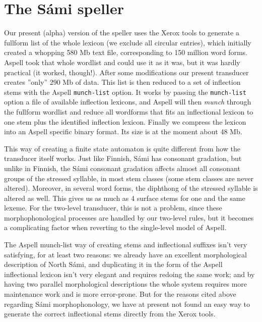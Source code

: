 \section{The S\'{a}mi speller}

Our present (alpha) version of the speller uses the Xerox tools to generate a fullform list of the whole lexicon (we exclude all circular entries), which initially created a whopping 580 Mb text file, corresponding to 150 million word forms. Aspell took that whole wordlist and could use it as it was, but it was hardly practical (it worked, though!). After some modifications our present transducer creates ''only'' 290 Mb of data. This list is then reduced to a set of inflection stems with the Aspell \texttt{munch-list} option. It works by passing the \texttt{munch-list} option a file of available inflection lexicons, and Aspell will then \textit{munch} through the fullform wordlist and reduce all wordforms that fits an inflectional lexicon to one stem plus the identified inflection lexicon. Finally we compress the lexicon into an Aspell specific binary format. Its size is at the moment about 48 Mb.

This way of creating a finite state automaton is quite different from how the transducer itself works. Just like Finnish, S\'{a}mi has consonant gradation, but unlike in Finnish, the S\'{a}mi consonant gradation affects almost all consonant groups of the stressed syllable, in most stem classes (some stem classes are never altered). Moreover, in several word forms, the diphthong of the stressed syllable is altered as well. This gives us as much as 4 surface stems for one and the same lexeme. For the two-level transducer, this is not a problem, since these morphophonological processes are handled by our two-level rules, but it becomes a complicating factor when reverting to the single-level model of Aspell.

The Aspell munch-list way of creating stems and inflectional suffixes isn't very satisfying, for at least two reasons: we already have an excellent morphological description of North S\'{a}mi, and duplicating it in the form of the Aspell inflectional lexicon isn't very elegant and requires redoing the same work; and by having two parallel morphological descriptions the whole system requires more maintenance work and is more error-prone. But for the reasons cited above regarding S\'{a}mi morphophonology, we have at present not found an easy way to generate the correct inflectional stems directly from the Xerox tools.

